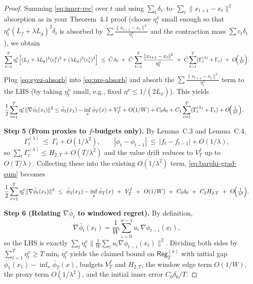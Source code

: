 \documentclass{uai2026} %
\newcommand{\Reg}{\mathsf{Reg}}
\begin{document}
\begin{proof}
Summing \eqref{eq:inner-rec} over $t$ and using $\sum_t \delta_t$–to–$\sum_t\|x_{t+1}-x_t\|^2$ absorption as in your Theorem~4.1 proof (choose $\eta^x_t$ small enough so that $\eta^x_t (L_f+\lambda L_g)^2\delta_t$ is absorbed by $\sum \frac{\|x_{t+1}-x_t\|^2}{\eta^x_t}$ and the contraction mass $\sum c_t\delta_t$), we obtain
\begin{equation}
\sum_{t=1}^T\eta^x_t\Bigl[(L_f+\lambda L_g)^2(e^y_t)^2+(\lambda L_g)^2(e^z_t)^2\Bigr]
\ \le\ \tilde C\,\delta_0\ +\ \tilde C\,\sum_{t=1}^T\frac{\|x_{t+1}-x_t\|^2}{\eta^x_t}\ +\ \tilde C\sum_{t=1}^T(\Gamma^{(\lambda)}_t+\Gamma_t)
\ +\ O\!\Bigl(\tfrac{1}{\lambda^2}\Bigr).
\label{eq:eyez-absorb}
\end{equation}
Plug \eqref{eq:eyez-absorb} into \eqref{eq:pre-absorb} and absorb the $\sum \frac{\|x_{t+1}-x_t\|^2}{\eta^x_t}$ term to the LHS (by taking $\eta^x_t$ small, e.g., fixed $\eta^x\le 1/(2L_\phi)$). This yields
\begin{align}
\frac{1}{2}\sum_{t=1}^T\eta^x_t\|\nabla\bar\phi_t(x_t)\|^2
&\le \bar\phi_1(x_1)-\inf_x\bar\phi_T(x) + V_T^{f}+O(1/W) + C_0\delta_0 + C_1\sum_{t=1}^T(\Gamma^{(\lambda)}_t+\Gamma_t) + O\!\Bigl(\tfrac{1}{\lambda^2}\Bigr).
\label{eq:barphi-grad-sum}
\end{align}

\smallskip
\textbf{Step 5 (From proxies to \(f\)-budgets only).}
By Lemma~C.3 and Lemma~C.4,
\[
\Gamma^{(\lambda)}_t\ \le\ \Gamma_t+O(1/\lambda^2),\qquad 
|\phi_t-\phi_{t-1}|\ \le\ |f_t-f_{t-1}|+O(1/\lambda),
\]
so $\sum_t\Gamma^{(\lambda)}_t \le H_{2,T}+O(T/\lambda^2)$ and the value drift reduces to $V_T^{f}$ up to $O(T/\lambda)$. Collecting these into the existing $O(1/\lambda^2)$ term, \eqref{eq:barphi-grad-sum} becomes
\[
\frac{1}{2}\sum_{t=1}^T\eta^x_t\|\nabla\bar\phi_t(x_t)\|^2
\ \le\ \bar\phi_1(x_1)-\inf_x\bar\phi_T(x)\ +\ V_T^{f}\ +\ O(1/W)\ +\ C_0\delta_0\ +\ C_2 H_{2,T}\ +\ O\!\Bigl(\tfrac{1}{\lambda^2}\Bigr).
\]

\smallskip
\textbf{Step 6 (Relating $\nabla\bar\phi_t$ to windowed regret).}
By definition,
\[
\nabla\bar\phi_t(x_t)=\frac{1}{W}\sum_{i=0}^{w-1}u_i\,\nabla\phi_{t-i}(x_t),
\]
so the LHS is exactly $\sum_t \eta^x_t \bigl\|\frac{1}{W}\sum_{i}u_i\nabla\phi_{t-i}(x_t)\bigr\|^2$. Dividing both sides by $\sum_{t=1}^T\eta^x_t\ge T\min_t\eta^x_t$ yields the claimed bound on $\Reg_T^{(u)}$ with initial gap $\bar\phi_1(x_1)-\inf_x \bar\phi_T(x)$, budgets $V_T^{f}$ and $H_{2,T}$, the window edge term $O(1/W)$, the proxy term $O(1/\lambda^2)$, and the initial inner error $C_0\delta_0/T$.
\end{proof}
\end{document}
